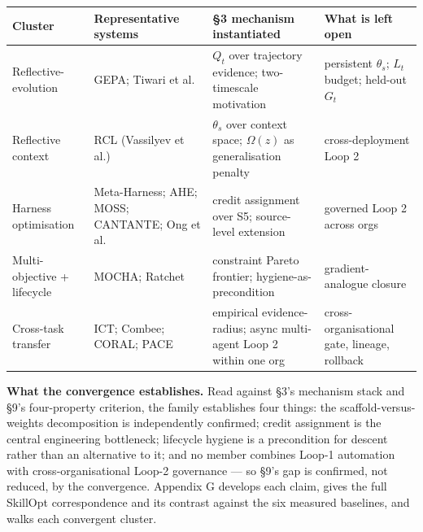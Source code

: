 {\def\LTcaptype{none} %
\begin{longtable}[]{@{}
  >{\raggedright\arraybackslash}p{}
  >{\raggedright\arraybackslash}p{}
  >{\raggedright\arraybackslash}p{}
  >{\raggedright\arraybackslash}p{}@{}}
\toprule\noalign{}
\begin{minipage}[b]{\linewidth}\raggedright
Cluster
\end{minipage} & \begin{minipage}[b]{\linewidth}\raggedright
Representative systems
\end{minipage} & \begin{minipage}[b]{\linewidth}\raggedright
§3 mechanism instantiated
\end{minipage} & \begin{minipage}[b]{\linewidth}\raggedright
What is left open
\end{minipage} \\
\midrule\noalign{}
\endhead
\bottomrule\noalign{}
\endlastfoot
Reflective-evolution & GEPA; Tiwari et al. & \(Q_t\) over trajectory
evidence; two-timescale motivation & persistent \(\theta_s\); \(L_t\)
budget; held-out \(G_t\) \\
Reflective context & RCL (Vassilyev et al.) & \(\theta_s\) over context
space; \(\Omega(z)\) as generalisation penalty & cross-deployment Loop
2 \\
Harness optimisation & Meta-Harness; AHE; MOSS; CANTANTE; Ong et al. &
credit assignment over S5; source-level extension & governed Loop 2
across orgs \\
Multi-objective + lifecycle & MOCHA; Ratchet & constraint Pareto
frontier; hygiene-as-precondition & gradient-analogue closure \\
Cross-task transfer & ICT; Combee; CORAL; PACE & empirical
evidence-radius; async multi-agent Loop 2 within one org &
cross-organisational gate, lineage, rollback \\
\end{longtable}
}

\textbf{What the convergence establishes.} Read against §3's mechanism
stack and §9's four-property criterion, the family establishes four
things: the scaffold-versus-weights decomposition is independently
confirmed; credit assignment is the central engineering bottleneck;
lifecycle hygiene is a precondition for descent rather than an
alternative to it; and no member combines Loop-1 automation with
cross-organisational Loop-2 governance --- so §9's gap is confirmed, not
reduced, by the convergence. Appendix G develops each claim, gives the
full SkillOpt correspondence and its contrast against the six measured
baselines, and walks each convergent cluster.

